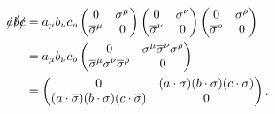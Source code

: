 \begin{align*}
  \slashed{a}\slashed{b}\slashed{c} &= a_\mu b_\nu c_\rho
  \begin{pmatrix}
    0 & \sigma^\mu \\
    \overline{\sigma}^\mu & 0
  \end{pmatrix}
  \begin{pmatrix}
    0 & \sigma^\nu \\
    \overline{\sigma}^\nu & 0
  \end{pmatrix}
  \begin{pmatrix}
    0 & \sigma^\rho \\
    \overline{\sigma}^\rho & 0
  \end{pmatrix}
  \\
  &= a_\mu b_\nu c_\rho
  \begin{pmatrix}
    0 & \sigma^\mu \overline{\sigma}^\nu \sigma^\rho \\
    \overline{\sigma}^\mu \sigma^\nu \overline{\sigma}^\rho & 0
  \end{pmatrix}
  \\
  &=
  \begin{pmatrix}
    0 & (a \cdot \sigma)(b \cdot \overline\sigma)(c \cdot \sigma) \\
    (a \cdot \overline\sigma)(b \cdot \sigma)(c \cdot \overline\sigma) & 0
  \end{pmatrix}
  .
\end{align*}

